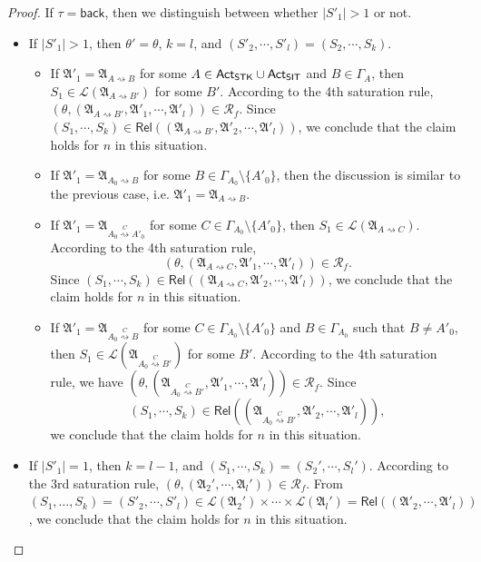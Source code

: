 \documentclass[preprint,12pt]{elsarticle}
\newcommand\act{{\sf Act}}
\newcommand\singletask{{\sf STK}}
\newcommand\singleinstance{{\sf SIT}}
\newcommand\back{{\mathsf{back} }}
\newcommand\AutReach{\mathscr{R}}
\newcommand\Rel{\mathsf{Rel}}
\newcommand\Aut{{\mathfrak{A} }}
\newcommand\Lang{{\mathscr{L} }}
\begin{document}
\begin{proof}
If $\tau = \back$, then we distinguish between whether $|S'_1| > 1$ or not. 
\begin{itemize}
\item If $|S'_1| > 1$, then $\theta' = \theta$, $k=l$, and $(S'_2, \cdots, S'_l) = (S_2, \cdots, S_k)$. 
\begin{itemize}
\item If $\Aut'_1 = \Aut_{A \rightsquigarrow B}$  for some $A \in \act_\singletask \cup \act_\singleinstance$ and $B \in \Gamma_A$, then $S_1 \in \Lang(\Aut_{A \rightsquigarrow B'})$ for some $B'$.  According to the 4th saturation rule, $(\theta, (\Aut_{A \rightsquigarrow B'}, \Aut'_1, \cdots, \Aut'_l)) \in \AutReach_f$. Since $(S_1, \cdots, S_k) \in \Rel((\Aut_{A \rightsquigarrow B'}, \Aut'_2, \cdots, \Aut'_l))$, we conclude that the claim holds for $n$ in this situation. 
%
\item If $\Aut'_1 = \Aut_{A_0 \rightsquigarrow B}$  for some $B \in \Gamma_{A_0} \setminus \{A'_0\}$, then the discussion is similar to the previous case, i.e. $\Aut'_1 = \Aut_{A \rightsquigarrow B}$. 
%
\item If $\Aut'_1 = \Aut_{A_0 \stackrel{C}{\rightsquigarrow} A'_0}$ for some $C \in \Gamma_{A_0} \setminus \{A'_0\}$, then $S_1 \in \Lang(\Aut_{A \rightsquigarrow C})$. According to the 4th saturation rule, 
$$(\theta, (\Aut_{A \rightsquigarrow C}, \Aut'_1, \cdots, \Aut'_l)) \in \AutReach_f.$$ 
Since $(S_1, \cdots, S_k) \in \Rel((\Aut_{A \rightsquigarrow C}, \Aut'_2, \cdots, \Aut'_l))$, we conclude that the claim holds for $n$ in this situation. 
%
\item If $\Aut'_1 = \Aut_{A_0 \stackrel{C}{\rightsquigarrow} B}$ for some $C \in \Gamma_{A_0} \setminus \{A'_0\}$ and $B \in \Gamma_{A_0}$ such that $B \neq A'_0$, then $S_1 \in \Lang(\Aut_{A_0 \stackrel{C}{\rightsquigarrow} B'})$ for some $B'$. According to the 4th saturation rule, we have $(\theta, (\Aut_{A_0 \stackrel{C}{\rightsquigarrow} B'}, \Aut'_1, \cdots, \Aut'_l)) \in \AutReach_f$. Since 
%
$$(S_1, \cdots, S_k) \in \Rel((\Aut_{A_0 \stackrel{C}{\rightsquigarrow} B'}, \Aut'_2, \cdots, \Aut'_l)),$$ 
%
we conclude that the claim holds for $n$ in this situation. 
%
\end{itemize}
%
\item If $|S'_1| = 1$, then $k = l - 1$, and $(S_1,\cdots,S_k) = (S_2',\cdots,S_l')$. According to the 3rd saturation rule, $(\theta, (\Aut_2',\cdots,\Aut_l')) \in \AutReach_f$. From $(S_1,\dots,S_k) = (S'_2, \cdots, S'_l) \in \Lang(\Aut_2') \times \cdots \times \Lang(\Aut_l') = \Rel((\Aut'_2, \cdots, \Aut'_l))$, we conclude that the claim holds for $n$ in this situation. 
\end{itemize}



\end{proof}
\end{document}
